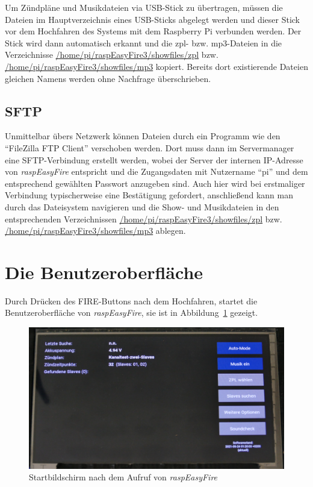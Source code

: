 \documentclass[paper=a4, parskip, numbers=noenddot, toc=listof, headsepline]{scrbook}
\newcommand{\REF}{\emph{raspEasyFire}}
\begin{document}
				Um Zündpläne und Musikdateien via USB-Stick zu übertragen, müssen die Dateien im Hauptverzeichnis eines USB-Sticks abgelegt werden und dieser Stick vor dem Hochfahren des Systems mit dem Raspberry Pi verbunden werden. Der Stick wird dann automatisch erkannt und die zpl- bzw. mp3-Dateien in die Verzeichnisse \url{/home/pi/raspEasyFire3/showfiles/zpl} bzw. \url{/home/pi/raspEasyFire3/showfiles/mp3} kopiert. Bereits dort existierende Dateien gleichen Namens werden ohne Nachfrage überschrieben.

			\subsection{SFTP}

				Unmittelbar übers Netzwerk können Dateien durch ein Programm wie den \enquote{FileZilla FTP Client} verschoben werden. Dort muss dann im Servermanager eine SFTP-Verbindung erstellt werden, wobei der Server der internen IP-Adresse von {\REF} entspricht und die Zugangsdaten mit Nutzername \enquote{pi} und dem entsprechend gewählten Passwort anzugeben sind. Auch hier wird bei erstmaliger Verbindung typischerweise eine Bestätigung gefordert, anschließend kann man durch das Dateisystem navigieren und die Show- und Musikdateien in den entsprechenden Verzeichnissen \url{/home/pi/raspEasyFire3/showfiles/zpl} bzw. \url{/home/pi/raspEasyFire3/showfiles/mp3} ablegen.

		\section{Die Benutzeroberfläche}

			Durch Drücken des FIRE-Buttons nach dem Hochfahren, startet die Benutzeroberfläche von {\REF}, sie ist in Abbildung~\ref{fig:REFstartscreen} gezeigt.

			\begin{figure}
				\centering\includegraphics[width=150mm]{Bilder/REFstartscreen}
				\caption{Startbildschirm nach dem Aufruf von \REF}
				\label{fig:REFstartscreen}
			\end{figure}
\end{document}

